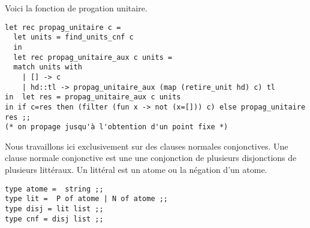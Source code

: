 Voici la fonction de progation unitaire.
\begin{Verbatim}
let rec propag_unitaire c =
  let units = find_units_cnf c 
  in 
  let rec propag_unitaire_aux c units =
  match units with 
    | [] -> c
    | hd::tl -> propag_unitaire_aux (map (retire_unit hd) c) tl 
in  let res = propag_unitaire_aux c units
in if c=res then (filter (fun x -> not (x=[])) c) else propag_unitaire res ;;
(* on propage jusqu'à l'obtention d'un point fixe *)
\end{Verbatim}
	
Nous travaillons ici exclusivement sur des clauses normales conjonctives.
Une clause normale conjonctive est une une conjonction de plusieurs disjonctions de plusieurs littéraux.
Un littéral est un atome ou la négation d'un atome.
\begin{Verbatim}
type atome =  string ;;
type lit =  P of atome | N of atome ;;
type disj = lit list ;; 
type cnf = disj list ;;
\end{Verbatim}


